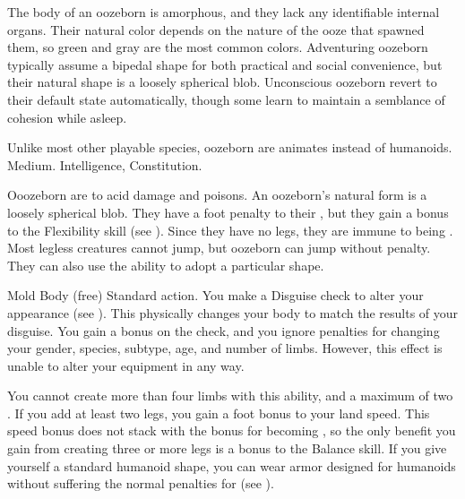     The body of an oozeborn is amorphous, and they lack any identifiable internal organs.
    Their natural color depends on the nature of the ooze that spawned them, so green and gray are the most common colors.
    Adventuring oozeborn typically assume a bipedal shape for both practical and social convenience, but their natural shape is a loosely spherical blob.
    Unconscious oozeborn revert to their default state automatically, though some learn to maintain a semblance of cohesion while asleep.

     Unlike most other playable species, oozeborn are animates instead of humanoids.
     Medium.
      Intelligence,  Constitution.
    \begin{itemize}
         Ooozeborn are  to acid damage and poisons.
         An oozeborn's natural form is a loosely spherical blob.
            They have a  foot penalty to their , but they gain a  bonus to the Flexibility skill (see ).
            Since they have no legs, they are immune to being \prone.
            Most legless creatures cannot jump, but oozeborn can jump without penalty.
            They can also use the  ability to adopt a particular shape.
            \begin{sustainability}{Mold Body}{ (free)}
                \abilityusagetime Standard action.
                \rankline
                You make a Disguise check to alter your appearance (see ).
                This physically changes your body to match the results of your disguise.
                You gain a  bonus on the check, and you ignore penalties for changing your gender, species, subtype, age, and number of limbs.
                However, this effect is unable to alter your equipment in any way.

                You cannot create more than four limbs with this ability, and a maximum of two .
                If you add at least two legs, you gain a  foot bonus to your land speed.
                This speed bonus does not stack with the bonus for becoming , so the only benefit you gain from creating three or more legs is a  bonus to the Balance skill.
                If you give yourself a standard humanoid shape, you can wear armor designed for humanoids without suffering the normal penalties for  (see ).


\end{sustainability}
\end{itemize}
